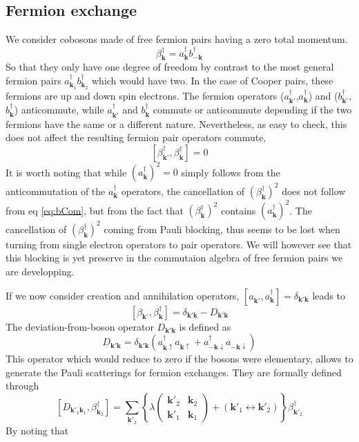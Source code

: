 \documentclass[aps,prb,amsmath,amssymb,superscriptaddress,twocolumn]{revtex4-1}
\newcommand{\vk}{\ensuremath{\mathbf{k}}}
\newcommand{\br}[1]{\ensuremath{\left(#1\right)}}
\newcommand{\mbr}[1]{\ensuremath{\left[#1\right]}}
\newcommand{\bbr}[1]{\ensuremath{\left\{#1\right\}}}
\newcommand{\fmtrx}[4]{\ensuremath{\br{\begin{smallmatrix}#1&#2\\#3&#4\end{smallmatrix}}}}
\newcommand{\com}[2]{\ensuremath{\mbr{#1,#2}}}
\newcommand{\D}{\ensuremath{\mathit{D}}}
\begin{document}
\subsection{Fermion exchange}
We consider cobosons made of free fermion pairs having a zero total momentum. 
\begin{equation}
\beta^{\dagger}_\vk=a^{\dagger}_{\vk}b^{\dagger}_{-\vk}
\end{equation}
So that they only have one degree of freedom by contrast to the most general fermion pairs $a^{\dagger}_{\vk_1}b^{\dagger}_{\vk_2}$ which would have two.  In the case of Cooper pairs, these fermions are up and down spin electrons.  The fermion operators ($a^{\dagger}_{\vk'}$,$a^{\dagger}_{\vk}$) and ($b^{\dagger}_{\vk'}$,$b^{\dagger}_{\vk}$) anticommute, while $a^{\dagger}_{\vk'}$ and $b^{\dagger}_{\vk}$ commute or anticommute depending if the two fermions have the same or a different nature.  Nevertheless, as easy to check, this does not affect the resulting fermion pair operators commute,
\begin{equation}\label{eq:bCom}
\com{\beta^{\dagger}_{\vk'}}{\beta^{\dagger}_{\vk}}=0
\end{equation}
It is worth noting that while $\br{a^{\dagger}_{\vk}}^2=0$ simply follows from  the anticommutation of the $a^{\dagger}_{\vk}$ operators, the cancellation of $\br{\beta^{\dagger}_{\vk}}^2$ does not follow from eq \eqref{eq:bCom}, but from the fact that  $\br{\beta^{\dagger}_{\vk}}^2$ contains $\br{a^{\dagger}_{\vk{}}}^2$.  The cancellation of $\br{\beta^{\dagger}_{\vk}}^2$ coming from Pauli blocking, thus seems to be lost when turning from single electron operators  to pair operators. We will however see  that this blocking is yet preserve in the commutaion  algebra of free fermion pairs we are developping. 

If we now consider creation and annihilation operators, $\com{a^{}_{\vk'}}{a^{\dagger}_{\vk{}}}=\delta_{\vk'\vk}$ leads to 
\begin{equation}\label{eq:betacom}
\com{\beta_{\vk'}}{\beta^{\dagger}_{\vk}}=\delta_{\vk'\vk}-\D_{\vk'\vk}
\end{equation}
The deviation-from-boson operator $\D_{\vk'\vk}$ is defined as
\begin{equation}\label{eq:D}
\D_{\vk'\vk}=\delta_{\vk'\vk}\br{a^{\dagger}_{\vk\uparrow}a^{}_{\vk\uparrow}+a^{\dagger}_{-\vk\downarrow}a^{}_{-\vk\downarrow}}
\end{equation}
This operator  which would reduce to  zero if the bosons were elementary,  allows to generate the Pauli scatterings for fermion exchanges.  They are formally defined through
\begin{equation}
\com{\D_{\vk'_1\vk_1}}{\beta^{\dagger}_{\vk_2}}=\sum_{\vk'_2}\bbr{\lambda\fmtrx{\vk'_2}{\vk_2}{\vk'_1}{\vk_1}+\br{\vk'_1\leftrightarrow\vk'_2}}\beta^{\dagger}_{\vk'_2}
\end{equation}
By noting that
\end{document}
